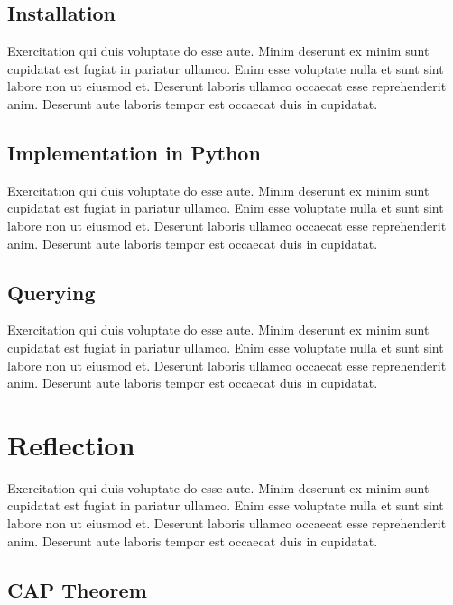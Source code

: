 \subsection{Installation} \label{subsec:installationNeo4j}

Exercitation qui duis voluptate do esse aute. Minim deserunt ex minim sunt cupidatat est fugiat in pariatur ullamco. Enim esse voluptate nulla et sunt sint labore non ut eiusmod et. Deserunt laboris ullamco occaecat esse reprehenderit anim. Deserunt aute laboris tempor est occaecat duis in cupidatat.

\subsection{Implementation in Python} \label{subsec:implementationPythonNeo4j}

Exercitation qui duis voluptate do esse aute. Minim deserunt ex minim sunt cupidatat est fugiat in pariatur ullamco. Enim esse voluptate nulla et sunt sint labore non ut eiusmod et. Deserunt laboris ullamco occaecat esse reprehenderit anim. Deserunt aute laboris tempor est occaecat duis in cupidatat.

\subsection{Querying} \label{subsec:queryingNeo4j}

Exercitation qui duis voluptate do esse aute. Minim deserunt ex minim sunt cupidatat est fugiat in pariatur ullamco. Enim esse voluptate nulla et sunt sint labore non ut eiusmod et. Deserunt laboris ullamco occaecat esse reprehenderit anim. Deserunt aute laboris tempor est occaecat duis in cupidatat.

\section{Reflection} \label{sec:reflectionNeo4j}

Exercitation qui duis voluptate do esse aute. Minim deserunt ex minim sunt cupidatat est fugiat in pariatur ullamco. Enim esse voluptate nulla et sunt sint labore non ut eiusmod et. Deserunt laboris ullamco occaecat esse reprehenderit anim. Deserunt aute laboris tempor est occaecat duis in cupidatat.

\subsection{CAP Theorem} \label{subsec:capTheoremNeo4j}

